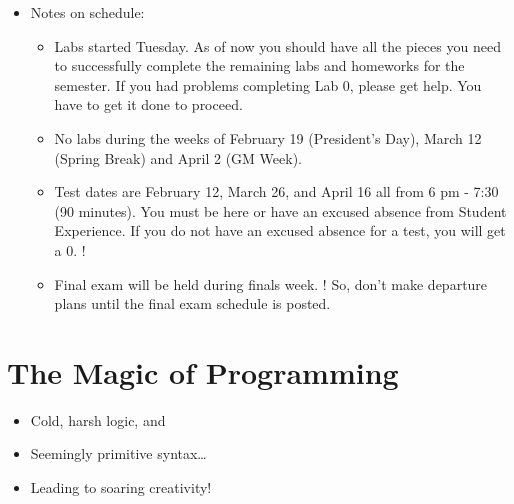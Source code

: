 \documentclass[letterpaper,10pt,english]{sphinxmanual}
\begin{document}
\begin{itemize}
\item {} 
Notes on schedule:
\begin{itemize}
\item {} 
Labs started Tuesday. As of now you should
have all the pieces you need to successfully complete
the remaining labs and homeworks for the semester.  If you had problems
completing Lab 0, please get help. You have to get it done to proceed.

\item {} 
No labs during the weeks of February 19 (President’s Day), March 12 (Spring Break) and
April 2 (GM Week).

\item {} 
Test dates are February 12, March 26, and April 16 all from 6 pm - 7:30 (90 minutes). You must be here or have an excused absence from Student Experience. If you do not have an excused absence for a test, you will get a 0. !

\item {} 
Final exam will be held during finals week.  !  So,
don’t make departure plans until the final exam schedule is posted.

\end{itemize}

\end{itemize}


\section{The Magic of Programming}
\label{\detokenize{lecture_notes/lec01_intro:the-magic-of-programming}}\begin{itemize}
\item {} 
Cold, harsh logic, and

\item {} 
Seemingly primitive syntax…

\item {} 
Leading to soaring creativity!

\end{itemize}
\end{document}
